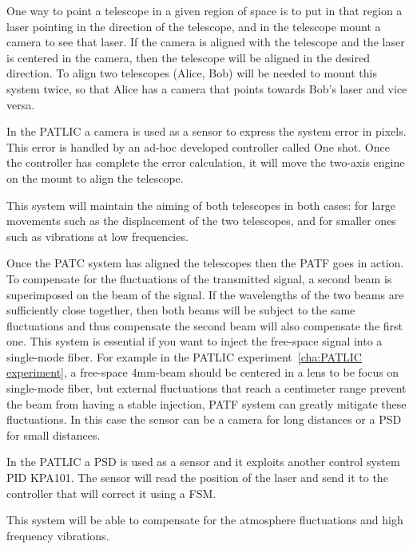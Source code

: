 One way to point a telescope in a given region of space is to put in that region a laser pointing in the direction of the telescope, and in the telescope mount a camera to see that laser.
If the camera is aligned with the telescope and the laser is centered in the camera, then the telescope will be aligned in the desired direction.
To align two telescopes (Alice, Bob) will be needed to mount this system twice, so that Alice has a camera that points towards Bob’s laser and vice versa.

In the PATLIC a camera is used as a sensor to express the system error in pixels. This error is handled by an ad-hoc developed controller called One shot. Once the controller has complete the error calculation, it will move the two-axis engine on the mount to align the telescope.

This system will maintain the aiming of both telescopes in both cases: for large movements such as the displacement of the two telescopes, and for smaller ones such as vibrations at low frequencies.


Once the PATC system has aligned the telescopes then the PATF goes in action. To compensate for the fluctuations of the transmitted signal, a second beam is superimposed on the beam of the signal. If the wavelengths of the two beams are sufficiently close together, then both beams will be subject to the same fluctuations and thus compensate the second beam will also compensate the first one.
This system is essential if you want to inject the free-space signal into a single-mode fiber. For example in the PATLIC experiment~\ref{cha:PATLIC experiment}, a free-space 4mm-beam should be centered in a lens to be focus on single-mode fiber, but external fluctuations that reach a centimeter range prevent the beam from having a stable injection, PATF system can greatly mitigate these fluctuations.
In this case the sensor can be a camera for long distances or a PSD for small distances.

In the PATLIC a PSD is used as a sensor and it exploits another control system PID KPA101. The sensor will read the position of the laser and send it to the controller that will correct it using a FSM.

This system will be able to compensate for the atmosphere fluctuations and high frequency vibrations.